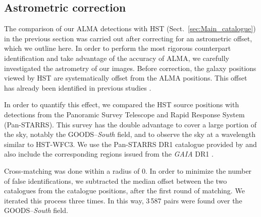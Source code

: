 \documentclass[longauth]{aa}
\begin{document}
\subsection{Astrometric correction}\label{sec:Astrometric_correction}

The comparison of our ALMA detections with HST (Sect.~\ref{sec:Main_catalogue}) in the previous section was carried out after correcting for an astrometric offset, which we outline here. In order to perform the most rigorous counterpart identification and take advantage of the accuracy of ALMA, we carefully investigated the astrometry of our images. Before correction, the galaxy positions viewed by HST are systematically offset from the ALMA positions. This offset has already been identified in previous studies \citep[e.g.][]{Maiolino2015, Rujopakarn2016, Dunlop2017}. 

In order to quantify this effect, we compared the HST source positions with detections from the Panoramic Survey Telescope and Rapid Response System (Pan-STARRS). This survey has the double advantage to cover a large portion of the sky, notably the GOODS--\textit{South} field, and to observe the sky at a wavelength similar to HST-WFC3. We use the Pan-STARRS DR1 catalogue provided by \cite{Flewelling2016} and also include the corresponding regions issued from the \textit{GAIA} DR1 \citep{Gaia_Collaboration2016}.

Cross-matching was done within a radius of 0. In order to minimize the number of false identifications, we subtracted the median offset between the two catalogues from the \cite{Guo2013} catalogue positions, after the first round of matching. We iterated this process three times. In this way, 3\,587 pairs were found over the GOODS--\textit{South} field.  
\end{document}
